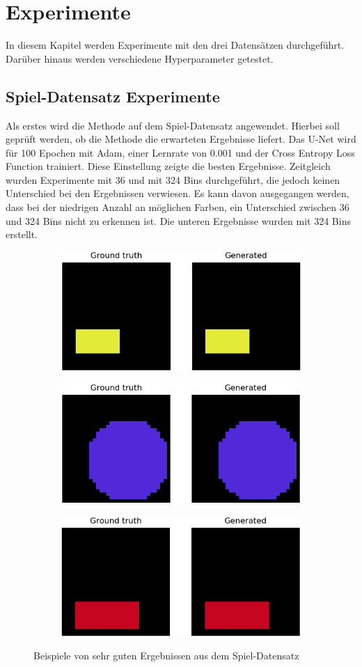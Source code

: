 \chapter{Experimente}
In diesem Kapitel werden Experimente mit den drei Datensätzen durchgeführt. Darüber hinaus werden verschiedene Hyperparameter getestet.

\section{Spiel-Datensatz Experimente}
\label{experimente:spiel}
Als erstes wird die Methode auf dem Spiel-Datensatz angewendet. Hierbei soll geprüft werden, ob die Methode die erwarteten
Ergebnisse liefert. Das U-Net wird für 100 Epochen mit Adam, einer Lernrate von 0.001 und der Cross Entropy Loss Function trainiert. Diese
Einstellung zeigte die besten Ergebnisse. Zeitgleich wurden Experimente mit 36 und mit 324 Bins durchgeführt, die jedoch keinen Unterschied bei den 
Ergebnissen verwiesen. Es kann davon ausgegangen werden, dass bei der niedrigen Anzahl an möglichen Farben, ein Unterschied zwischen 36 und 324 Bins
nicht zu erkennen ist. Die unteren Ergebnisse wurden mit 324 Bins erstellt.

\begin{figure}[H]
  \vspace{1cm}
  \begin{subfigure}
    \centering
    \includegraphics[width=.32\textwidth]{resources/experiments/30.png}
  \end{subfigure}
  \begin{subfigure}
    \centering
    \includegraphics[width=.32\textwidth]{resources/experiments/31.png}
  \end{subfigure}
  \begin{subfigure}
    \centering
    \includegraphics[width=.32\textwidth]{resources/experiments/42.png}
  \end{subfigure}
  \caption{Beispiele von sehr guten Ergebnissen aus dem Spiel-Datensatz}
  \label{image:gute-ergebnisse-toy-dataset}
\end{figure}

